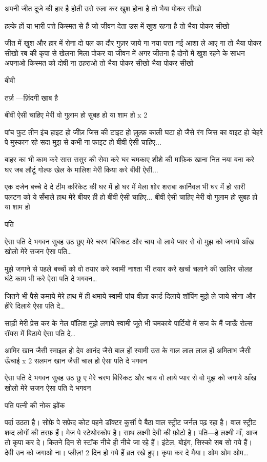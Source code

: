 अपनी जीत दूजे की हार है होती
उसे रुला कर खुश होना है
तो भैया पोकर सीखो

हल्के हों या भारी पत्ते किस्मत से हैं
जो जीवन देता उस में खुश रहना है
तो भैया पोकर सीखो

जीत में खुश और हार में रोना
दो पल का दौर गुज़र जाये गा
नया पत्ता नई आशा ले आए गा
तो भैया पोकर सीखो
रब की कृपा से खेलना मिला
पोकर या जीवन में
अगर जीतना है दोनों में
खुश रहने के साधन अपनाओ
किस्मत को दोषी ना ठहराओ
तो भैया पोकर सीखो
भैया पोकर सीखो



बीवी

तर्ज़ —ज़िंदगी खाब है 

बीवी ऐसी चाहिए मेरी वो गुलाम हो
सुबह हो या शाम हो x 2

पांच फुट तीन इंच हाइट हो
जींज़ जिस की टाइट हो
ज़ुल्फ़ काली घटा हो जैसे
रंग जिस का वाइट हो
चेहरे पे मुस्कान रहे सदा
मुझ से कभी ना फाइट हो
बीवी ऐसी चाहिए...

बाहर का भी काम करे
सास ससुर की सेवा करे
घर चमकाए शीशे की माफ़िक
खाना नित नया बना करे
घर जब लौटूं गोल्फ खेल के
मालिश मेरी किया करे
बीवी ऐसी...

एक दर्जन बच्चे दे दे
टीम करिकेट की घर में हो
घर में मेला शोर शराबा
कार्निवल भी घर में हो
सारी पलटन को ये सँभाले
हाथ मेरे बीयर ही हो
बीवी ऐसी चाहिए...
बीवी ऐसी चाहिए मेरी वो गुलाम हो
सुबह हो या शाम हो

पति

ऐसा पति दे भगवन
सुबह उठ छुए मेरे चरण
बिस्किट और चाय वो लाये
प्यार से वो मुझ को जगाये
आँख खोलो मेरे सजन
ऐसा पति…

मुझे जगाने से पहले
बच्चों को वो तयार करे
स्वामी नाश्ता भी तयार करे
खर्चा चलाने की खातिर
सोलह घंटे काम भी करे
ऐसा पति दे भगवन…

जितने भी पैसे कमाये
मेरे हाथ में ही थमाये
स्वामी पांच वीज़ा कार्ड दिलाये
शॉपिंग मुझे ले जाये
सोना और हीरे दिलाये
ऐसा पति दे…

साड़ी मेरी प्रेस कर के
नेल पॉलिश मुझे लगाये
स्वामी जूते भी चमकाये
पार्टियों में सज के मैं जाऊँ
रोल्स रॉयस में बिठाये
ऐसा पति दे…

आमिर खान जैसी स्माइल हो
देव आनंद जैसे बाल हों
स्वामी उस के गाल लाल लाल हों
अमिताभ जैसी ऊँचाई x 2
सलमन खान जैसी चाल हो
ऐसा पति दे भगवन

ऐसा पति दे भगवन
सुबह उठ छु ए मेरे चरण
बिस्किट और चाय वो लाये
प्यार से वो मुझ को जगाये
आँख खोलो मेरे सजन
ऐसा पति दे भगवन


पति पत्नी की नोक झोंक

पर्दा उठता है। सोफ़े पे सफ़ेद कोट पहने
डॉक्टर कुर्सी पे बैठा वाल स्ट्रीट जर्नल पढ़
रहा है। वाल स्ट्रीट शब्द लोगों की तरफ़ हैं।
मेज़ पे स्टेथोस्कोप है। साथ लक्ष्मी देवी की
फ़ोटो है।
पति—हे लक्ष्मी माँ, आज तो कृपा कर दे।
कितने दिन से स्टॉक नीचे ही नीचे जा रहे हैं।
इंटेल, बोइंग, सिस्को सब सो गये हैं। देवी उन
को जगाओ ना। प्लीज़! 2 दिन हो गये हैं व्रत
रखे हुए। कृपा कर दे मैया।
ओम ओम ओम…

